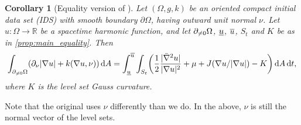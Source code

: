 \documentclass[draft]{amsart}
\newtheorem{corollary}[theorem]{Corollary}
\DeclarePairedDelimiter{\parens}{(}{)}
\let\p\parens %
\newcommand*{\maps}{\colon}
\newcommand*{\reals}{\mathbb{R}}
\newcommand*{\boundary}{\partial}
\DeclarePairedDelimiter{\abs}{\lvert}{\rvert} %
\newcommand*{\nolink}[1]{%
  {\protect\NoHyper#1\protect\endNoHyper}%
}
\begin{document}
\begin{corollary}[Equality version of \texorpdfstring{}{\nolink}{\cite[Proposition 4.2]{hirschSpacetimeHarmonicFunctions2021}}]
    Let \( (\Omega,g,k) \) be an oriented compact initial data set (IDS) with smooth boundary \( \boundary{\Omega} \), having outward unit normal \( \nu \). Let \( u\maps \Omega\to \reals \) be a spacetime harmonic function, and let \( \partial_{\neq 0}\Omega \), \( \underline{u} \), \( \overline{u} \), \( S_t \) and \( K \) be as in \cref{prop:main_equality}. Then
    \begin{equation*}
        \int_{\nonzeroboundary} (\partial_\nu \abs{\nabla u}+k(\nabla u,\nu))\odif{A}=\int_{\minu}^{\maxu}\int_{S_t} \p*{\frac{1}{2}\frac{\abs{\spacetimehessian u}}{\abs{\nabla u}^2}+\mu+J(\nabla u/\abs{\nabla u})-K}\odif A\odif{t},
    \end{equation*}
    where \( K \) is the level set Gauss curvature.
\end{corollary}
Note that the original \cite[Proposition 4.2]{hirschSpacetimeHarmonicFunctions2021} uses \( \nu \) differently than we do. In the above, \( \nu \) is still the normal vector of the level sets. 
\end{document}
